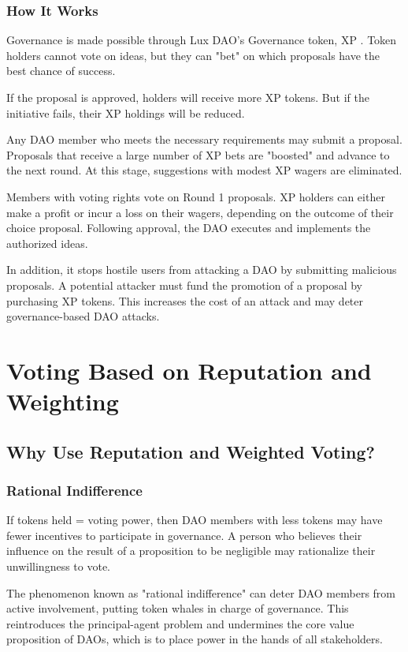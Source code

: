 \documentclass[11pt]{article}
\begin{document}
\subsubsection{How It Works}

Governance is made possible through Lux DAO's Governance token, XP . Token holders cannot vote on ideas, but they can "bet" on which proposals have the best chance of success.


If the proposal is approved, holders will receive more XP  tokens. But if the initiative fails, their XP  holdings will be reduced.


Any DAO member who meets the necessary requirements may submit a proposal. Proposals that receive a large number of XP bets are "boosted" and advance to the next round. At this stage, suggestions with modest XP wagers are eliminated.


Members with voting rights vote on Round 1 proposals. XP holders can either make a profit or incur a loss on their wagers, depending on the outcome of their choice proposal. Following approval, the DAO executes and implements the authorized ideas.


In addition, it stops hostile users from attacking a DAO by submitting malicious proposals. A potential attacker must fund the promotion of a proposal by purchasing XP  tokens. This increases the cost of an attack and may deter governance-based DAO attacks.


\section{Voting Based on Reputation and Weighting}

\subsection{Why Use Reputation and Weighted Voting?}

\subsubsection{Rational Indifference}

If tokens held = voting power, then DAO members with less tokens may have fewer incentives to participate in governance. A person who believes their influence on the result of a proposition to be negligible may rationalize their unwillingness to vote.


The phenomenon known as "rational indifference" can deter DAO members from active involvement, putting token whales in charge of governance. This reintroduces the principal-agent problem and undermines the core value proposition of DAOs, which is to place power in the hands of all stakeholders.
\end{document}
